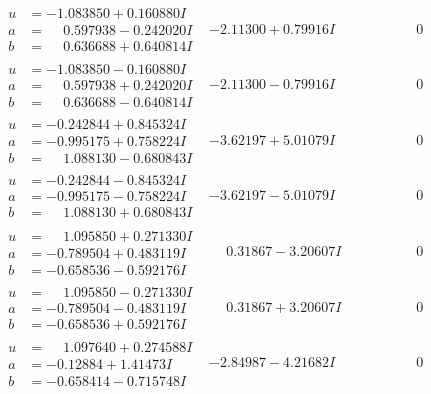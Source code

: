 \documentclass[1p]{elsarticle_modified}
\theoremstyle{definition}
\begin{document}
$$\begin{array}{c|c|c}
\begin{aligned}
u &= -1.083850 + 0.160880 I \\
a &= \phantom{-}0.597938 - 0.242020 I \\
b &= \phantom{-}0.636688 + 0.640814 I\end{aligned}
 & -2.11300 + 0.79916 I & \phantom{-0.000000 } 0 \\ \hline\begin{aligned}
u &= -1.083850 - 0.160880 I \\
a &= \phantom{-}0.597938 + 0.242020 I \\
b &= \phantom{-}0.636688 - 0.640814 I\end{aligned}
 & -2.11300 - 0.79916 I & \phantom{-0.000000 } 0 \\ \hline\begin{aligned}
u &= -0.242844 + 0.845324 I \\
a &= -0.995175 + 0.758224 I \\
b &= \phantom{-}1.088130 - 0.680843 I\end{aligned}
 & -3.62197 + 5.01079 I & \phantom{-0.000000 } 0 \\ \hline\begin{aligned}
u &= -0.242844 - 0.845324 I \\
a &= -0.995175 - 0.758224 I \\
b &= \phantom{-}1.088130 + 0.680843 I\end{aligned}
 & -3.62197 - 5.01079 I & \phantom{-0.000000 } 0 \\ \hline\begin{aligned}
u &= \phantom{-}1.095850 + 0.271330 I \\
a &= -0.789504 + 0.483119 I \\
b &= -0.658536 - 0.592176 I\end{aligned}
 & \phantom{-}0.31867 - 3.20607 I & \phantom{-0.000000 } 0 \\ \hline\begin{aligned}
u &= \phantom{-}1.095850 - 0.271330 I \\
a &= -0.789504 - 0.483119 I \\
b &= -0.658536 + 0.592176 I\end{aligned}
 & \phantom{-}0.31867 + 3.20607 I & \phantom{-0.000000 } 0 \\ \hline\begin{aligned}
u &= \phantom{-}1.097640 + 0.274588 I \\
a &= -0.12884 + 1.41473 I \\
b &= -0.658414 - 0.715748 I\end{aligned}
 & -2.84987 - 4.21682 I & \phantom{-0.000000 } 0 \\ \hline\begin{aligned}

\end{aligned}
\end{array}$$
\end{document}
